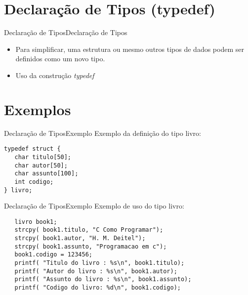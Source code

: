 \documentclass[aspectratio=169]{beamer}
\begin{document}
\section{Declaração de Tipos (typedef)}

\begin{frame}{Declaração de Tipos}{Declaração de Tipos}
\begin{itemize}
\item Para simplificar, uma estrutura ou mesmo outros tipos de dados podem ser definidos como um novo tipo.
\item Uso da construção {\it typedef}
\end{itemize}
\end{frame}	

\section{Exemplos}

\begin{frame}[fragile]{Declaração de Tipos}{Exemplo}
Exemplo da definição do tipo livro:
\begin{lstlisting}
typedef struct {
   char titulo[50];
   char autor[50];
   char assunto[100];
   int codigo;
} livro;
  \end{lstlisting} 
\end{frame}


\begin{frame}[fragile]{Declaração de Tipos}{Exemplo}
Exemplo de uso do tipo livro:
\begin{lstlisting}
   livro book1;   
   strcpy( book1.titulo, "C Como Programar");
   strcpy( book1.autor, "H. M. Deitel"); 
   strcpy( book1.assunto, "Programacao em c");
   book1.codigo = 123456;
   printf( "Titulo do livro : %s\n", book1.titulo);
   printf( "Autor do livro : %s\n", book1.autor);
   printf( "Assunto do livro : %s\n", book1.assunto);
   printf( "Codigo do livro: %d\n", book1.codigo);
  \end{lstlisting} 
\end{frame}
\end{document}
